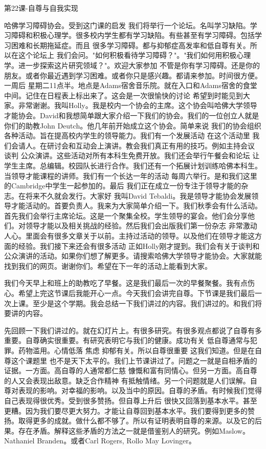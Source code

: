 第22课-自尊与自我实现 

哈佛学习障碍协会。受到这门课的启发 我们将举行一个论坛。名叫学习缺陷。学习障碍和积极心理学。很多校内学生都有学习缺陷。有些甚至有学习障碍。包括学习困难和长期拖延症。而且 很多学习障碍。都与抑郁症高发率和低自尊有关。所以在这个论坛上 我们会问。"如何积极看待学习障碍？"。"我们如何用积极心理学。进一步探索这片研究领域？"。欢迎大家参加 不管是你有学习障碍。还是你的朋友。或者你最近遇到学习困难。或者你只是感兴趣。都请来参加。时间很方便。一周后 星期二11点半。地点是Adams宿舍音乐院。就在入口和Adams宿舍的食堂中间。记住在日程表上标出来了。这会是一次很愉快的讨论 希望到时能见到大家。非常谢谢。我叫Holly。我是校内一个协会的主席。这个协会叫哈佛大学领导才能协会。David和我想简单跟大家介绍一下我们的协会。我们的一位创立人就是你们的助教John Deutch。他几年前开始成立这个协会。简单来说 我们的协会组织各种活动。旨在提高校内学生的领导能力。我们有一个发展活动 在这个活动里 我们会请人。在研讨会和互动会上演讲。教会我们真正有用的技巧。例如主持会议 谈判 公众演讲。这些活动对所有本科生免费开放。我们还会举行午餐会和论坛 让学生主席。总编辑。校园队长进行合作。我们还有一个拓展计划训练哈佛本科生。当领导才能课程的讲师。我们有一个长达一年的活动 每周六举行。是和我们这里的Cambridge中学生一起参加的。最后 我们正在成立一份专注于领导才能的杂志。在将来不久就会发行。大家好 我叫David Tebaldi。我是领导才能协会发展领导才能活动的。首要负责人。我来为大家简单介绍一下。我们秋季会有什么活动。首先我们会举行主席论坛。这是一个聚集全校。学生领导的宴会。他们会分享他们。对领导才能以及相关挑战的经验。然后我们会出版我们第一份杂志 非常激动人心。里面会有很多文章关于以前。主持过活动的领导。以及他们在领导才能这方面的经验。我们接下来还会有很多活动 正如Holly刚才提到。我们会有关于谈判和公众演讲的活动。如果你们想了解更多。请搜索哈佛大学领导才能协会。大家就能找到我们的网页。谢谢你们。希望在下一年的活动上能看到大家。 

我们今天早上和班上的助教吃了早餐。这是我们最后一次的早餐聚餐。我有点伤心。希望上完这节课后我能开心一点。今天我们会讲完自尊。下节课是我们最后一次上课。至少是这个学期。我会总结一下我们讲过的内容。我们讲过的。和我们将要讲的内容。 

先回顾一下我们讲过的。就在幻灯片上。有很多研究。有很多观点都说了自尊有多重要。自尊确实很重要。有研究表明它与我们的健康。成功有关 低自尊通常与犯罪。药物滥用。心情低落 焦虑 抑郁有关。所以自尊很重要 这我们知道。但是在自尊这个课题里 也不是天下太平的。我们上节课讲过了。问题之一就是自相矛盾的证据。一方面。高自尊的人通常都仁慈 慷慨和富有同情心。但另一方面。高自尊的人又会表现出敌意。缺乏合作精神 有抵触情绪。另一个问题就是人们误解。自尊对表现的影响。对幸福的影响。以及当中的原因。自尊的矛盾。有时候我们觉得自己表现得很优秀。受到很多赞扬。但自尊上升后 很快又回落到基本水平。甚至更糟。因为我们要尽更大努力。才能让自尊回到基本水平。我们要得到更多的赞扬。取得更多的成就。做什么都不够了。所以有证明表明自尊的来源。以及它的后果。存在矛盾。解释这些矛盾的方法之一就是借鉴别人的研究。例如Maslow。Nathaniel Branden。或者Carl Rogers, Rollo May Lovinger。 

